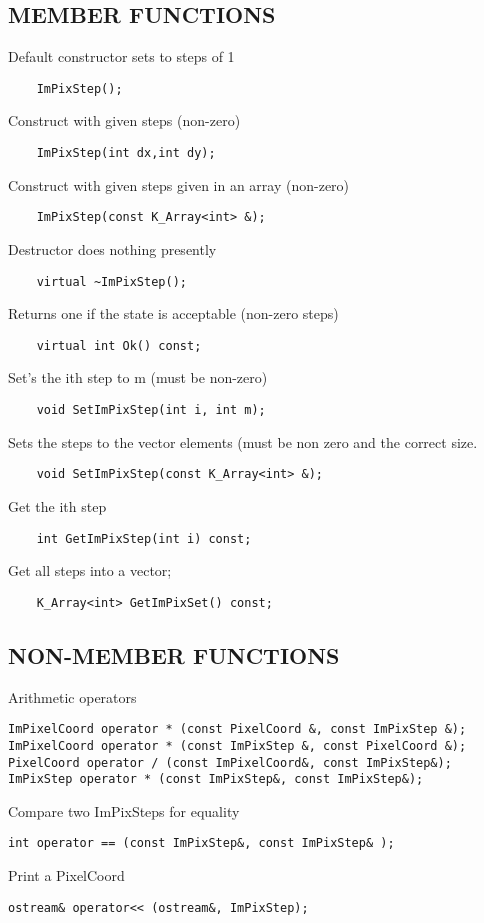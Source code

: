 \subsection*{MEMBER FUNCTIONS}
       Default constructor sets to steps of 1
\begin{verbatim}
    ImPixStep();
\end{verbatim}

       Construct with given steps (non-zero)
\begin{verbatim}
    ImPixStep(int dx,int dy);
\end{verbatim}

       Construct with given steps given in an array (non-zero)
\begin{verbatim}
    ImPixStep(const K_Array<int> &);
\end{verbatim}
    
       Destructor does nothing presently
\begin{verbatim}
    virtual ~ImPixStep();
\end{verbatim}

       Returns one if the state is acceptable (non-zero steps)
\begin{verbatim}
    virtual int Ok() const;
\end{verbatim}

       Set's the ith step to m (must be non-zero)
\begin{verbatim}
    void SetImPixStep(int i, int m);
\end{verbatim}

       Sets the steps to the vector elements (must be non zero and the
    correct size.
\begin{verbatim}
    void SetImPixStep(const K_Array<int> &);
\end{verbatim}

       Get the ith step
\begin{verbatim}
    int GetImPixStep(int i) const;
\end{verbatim}

       Get all steps into a vector;
\begin{verbatim}
    K_Array<int> GetImPixSet() const;
\end{verbatim}

\subsection*{NON-MEMBER FUNCTIONS}

   Arithmetic operators
\begin{verbatim}
ImPixelCoord operator * (const PixelCoord &, const ImPixStep &);
ImPixelCoord operator * (const ImPixStep &, const PixelCoord &);
PixelCoord operator / (const ImPixelCoord&, const ImPixStep&);
ImPixStep operator * (const ImPixStep&, const ImPixStep&);
\end{verbatim}

   Compare two ImPixSteps for equality
\begin{verbatim}
int operator == (const ImPixStep&, const ImPixStep& );
\end{verbatim}

   Print a PixelCoord
\begin{verbatim}
ostream& operator<< (ostream&, ImPixStep);
\end{verbatim}
